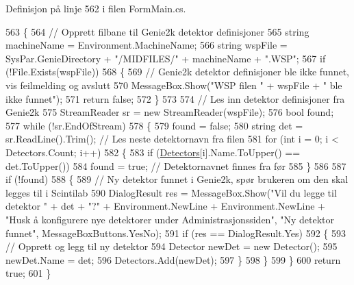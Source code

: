 Definisjon på linje 562 i filen Form\+Main.\+cs.


\begin{DoxyCode}
563         \{
564             \textcolor{comment}{// Opprett filbane til Genie2k detektor definisjoner}
565             \textcolor{keywordtype}{string} machineName = Environment.MachineName;
566             \textcolor{keywordtype}{string} wspFile = SysPar.GenieDirectory + \textcolor{stringliteral}{"/MIDFILES/"} + machineName + \textcolor{stringliteral}{".WSP"};
567             \textcolor{keywordflow}{if} (!File.Exists(wspFile))
568             \{
569                 \textcolor{comment}{// Genie2k detektor definisjoner ble ikke funnet, vis feilmelding og avslutt}
570                 MessageBox.Show(\textcolor{stringliteral}{"WSP filen "} + wspFile + \textcolor{stringliteral}{" ble ikke funnet"});
571                 \textcolor{keywordflow}{return} \textcolor{keyword}{false};
572             \}
573 
574             \textcolor{comment}{// Les inn detektor definisjoner fra Genie2k}
575             StreamReader sr = \textcolor{keyword}{new} StreamReader(wspFile);
576             \textcolor{keywordtype}{bool} found;
577             \textcolor{keywordflow}{while} (!sr.EndOfStream)
578             \{
579                 found = \textcolor{keyword}{false};
580                 \textcolor{keywordtype}{string} det = sr.ReadLine().Trim(); \textcolor{comment}{// Les neste detektornavn fra filen}
581                 \textcolor{keywordflow}{for} (\textcolor{keywordtype}{int} i = 0; i < Detectors.Count; i++)
582                 \{
583                     \textcolor{keywordflow}{if} (\hyperlink{class_scintilab_1_1_form_main_a88f16134102d9e4c5630adf5ff97f090}{Detectors}[i].Name.ToUpper() == det.ToUpper())
584                         found = \textcolor{keyword}{true}; \textcolor{comment}{// Detektornavnet finnes fra før}
585                 \}
586 
587                 \textcolor{keywordflow}{if} (!found)
588                 \{
589                     \textcolor{comment}{// Ny detektor funnet i Genie2k, spør brukeren om den skal legges til i Scintilab}
590                      DialogResult res = MessageBox.Show(\textcolor{stringliteral}{"Vil du legge til detektor "} + det + \textcolor{stringliteral}{"?"} + 
      Environment.NewLine + Environment.NewLine + \textcolor{stringliteral}{"Husk å konfigurere nye detektorer under Administrasjonssiden"}, \textcolor{stringliteral}{"Ny
       detektor funnet"}, MessageBoxButtons.YesNo);
591                      \textcolor{keywordflow}{if} (res == DialogResult.Yes)
592                      \{
593                          \textcolor{comment}{// Opprett og legg til ny detektor}
594                          Detector newDet = \textcolor{keyword}{new} Detector();
595                          newDet.Name = det;
596                          Detectors.Add(newDet);
597                      \}
598                 \}
599             \}
600             \textcolor{keywordflow}{return} \textcolor{keyword}{true};
601         \}
\end{DoxyCode}

